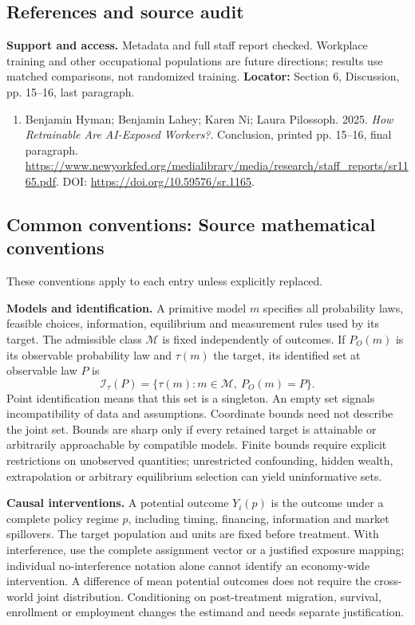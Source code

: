 \documentclass[11pt,a4paper]{article}
\begin{document}
\subsection*{References and source audit}
\textbf{Support and access.} Metadata and full staff report checked. Workplace training and other occupational populations are future directions; results use matched comparisons, not randomized training. \textbf{Locator:} Section 6, Discussion, pp. 15--16, last paragraph.
\begin{enumerate}\raggedright
\item\hypertarget{definitions:source:30007635:1}{} Benjamin Hyman; Benjamin Lahey; Karen Ni; Laura Pilossoph. 2025. \emph{How Retrainable Are AI-Exposed Workers?}. Conclusion, printed pp. 15–16, final paragraph.
\url{https://www.newyorkfed.org/medialibrary/media/research/staff_reports/sr1165.pdf}.
DOI: \url{https://doi.org/10.59576/sr.1165}.
\end{enumerate}

\subsection*{Common conventions: Source mathematical conventions}

These conventions apply to each entry unless explicitly replaced.

\textbf{Models and identification.} A primitive model \(m\) specifies all probability laws, feasible choices, information, equilibrium and measurement rules used by its target. The admissible class \(\mathcal M\) is fixed independently of outcomes. If \(P_O(m)\) is its observable probability law and \(\tau(m)\) the target, its identified set at observable law \(P\) is
\[
 \mathcal I_\tau(P)=\{\tau(m):m\in\mathcal M,\ P_O(m)=P\}.
\]
Point identification means that this set is a singleton. An empty set signals incompatibility of data and assumptions. Coordinate bounds need not describe the joint set. Bounds are sharp only if every retained target is attainable or arbitrarily approachable by compatible models. Finite bounds require explicit restrictions on unobserved quantities; unrestricted confounding, hidden wealth, extrapolation or arbitrary equilibrium selection can yield uninformative sets.

\textbf{Causal interventions.} A potential outcome \(Y_i(p)\) is the outcome under a complete policy regime \(p\), including timing, financing, information and market spillovers. The target population and units are fixed before treatment. With interference, use the complete assignment vector or a justified exposure mapping; individual no-interference notation alone cannot identify an economy-wide intervention. A difference of mean potential outcomes does not require the cross-world joint distribution. Conditioning on post-treatment migration, survival, enrollment or employment changes the estimand and needs separate justification.
\end{document}
